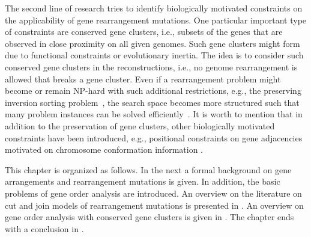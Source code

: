 \documentclass{svmult}
\begin{document}
The second line of research tries to identify biologically motivated constraints 
on the applicability of gene rearrangement mutations. One particular important
type of constraints are conserved gene clusters, i.e., subsets of the genes that are observed in close proximity on all given genomes. 
Such gene clusters might form due to functional constraints or evolutionary inertia. The idea is to consider such
conserved gene clusters in the reconstructions, i.e., no genome rearrangement is allowed that breaks a gene cluster. 
Even if a rearrangement problem might become or remain NP-hard with such additional restrictions, e.g., the preserving 
inversion sorting problem~\cite{Figeac_2004}, the search space becomes more structured such that many problem instances 
can be solved efficiently~\cite{Berard_2007,Bernt_2009,Bernt_2007}.
It is worth to mention that in addition to the preservation of gene
clusters, other biologically motivated constraints have been introduced, e.g., positional constraints on gene 
adjacencies motivated on chromosome conformation information
\cite{Swenson_2016, Veron_2011}.


This chapter is organized as follows. In the next  a formal
background on gene arrangements and rearrangement mutations is given. In addition, the basic problems of gene order analysis are 
introduced. An overview on the literature on cut and join models of rearrangement mutations is presented in . 
An overview on gene order analysis with conserved gene clusters is given in . 
The chapter ends with a conclusion in .
\end{document}
